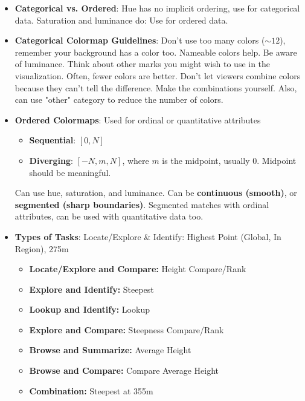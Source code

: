 \documentclass{report}
\begin{document}
\begin{itemize}
            \bigbreak \noindent 
        \item \textbf{Categorical vs. Ordered}: Hue has no implicit ordering, use for categorical data. Saturation and luminance do: Use for ordered data.
            \bigbreak \noindent 
        \item \textbf{Categorical Colormap Guidelines}: Don't use too many colors ($\sim 12$), remember your background has a color too. Nameable colors help. Be aware of luminance. Think about other marks you might wish to use in the visualization.
            \bigbreak \noindent 
            Often, fewer colors are better. Don't let viewers combine colors because they can't tell the difference. Make the combinations yourself. Also, can use "other" category to reduce the number of colors.
        \item \textbf{Ordered Colormaps}: Used for ordinal or quantitative attributes
            \begin{itemize}
                \item \textbf{Sequential}: $[0,N]$
                \item \textbf{Diverging}: $[-N, m, N]$, where $m$ is the midpoint, usually $0$. Midpoint should be meaningful. 
            \end{itemize}
            Can use hue, saturation, and luminance. Can be \textbf{continuous (smooth)}, or \textbf{segmented (sharp boundaries)}. Segmented matches with ordinal attributes, can be used with quantitative data too.
        \item \textbf{Types of Tasks}: Locate/Explore & Identify: Highest Point (Global, In Region), 275m
            \begin{itemize}
                \item \textbf{Locate/Explore and Compare:} Height Compare/Rank
                \item \textbf{Explore and Identify:} Steepest
                \item \textbf{Lookup and Identify:} Lookup
                \item \textbf{Explore and Compare:} Steepness Compare/Rank
                \item \textbf{Browse and Summarize:} Average Height
                \item \textbf{Browse and Compare:} Compare Average Height
                \item \textbf{Combination:} Steepest at 355m
            \end{itemize}


\end{itemize}
\end{document}
